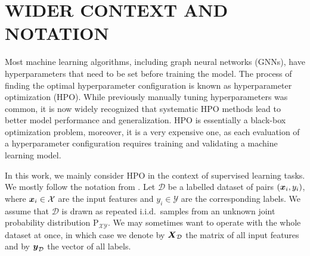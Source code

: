 \section{\uppercase{Wider context and Notation}}






Most machine learning algorithms, including graph neural networks (GNNs), have hyperparameters that need to be set before training the model. The process of finding the optimal hyperparameter configuration is known as hyperparameter optimization (HPO). While previously manually tuning hyperparameters was common, it is now widely recognized that systematic HPO methods lead to better model performance and generalization. HPO is essentially a black-box optimization problem, moreover, it is a very expensive one, as each evaluation of a hyperparameter configuration requires training and validating a machine learning model.

In this work, we mainly consider HPO in the context of supervised learning tasks. We mostly follow the notation from \cite{bischl_hyperparameter_2023}. Let \( \mathcal{D} \) be a labelled dataset of pairs \( \left( \boldsymbol{x}_i, y_i \right) \), where \( \boldsymbol{x}_i \in \mathcal{X} \) are the input features and \( y_i \in \mathcal{Y} \) are the corresponding labels. We assume that \( \mathcal{D} \) is drawn as repeated i.i.d.\ samples from an unknown joint probability distribution \( \mathrm{P}_{\mathcal{X}\mathcal{Y}} \). We may sometimes want to operate with the whole dataset at once, in which case we denote by \( \boldsymbol{X}_\mathcal{D} \) the matrix of all input features and by \( \boldsymbol{y}_\mathcal{D} \) the vector of all labels.


